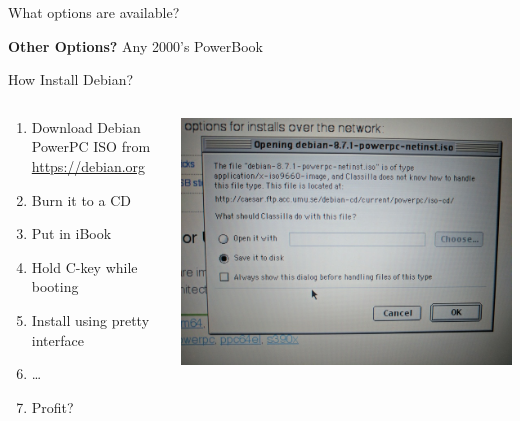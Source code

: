 \documentclass{lug}
\begin{document}
\begin{frame}{What options are available?}
    \pause

    \begin{center}
        \small
        \textbf{Other Options?} Any 2000's PowerBook
    \end{center}

\end{frame}

\begin{frame}{How Install Debian?}
    \begin{columns}
        \begin{column}{0.7\textwidth}
            \begin{enumerate}
                \setlength\itemsep{1em}
                \item Download Debian PowerPC ISO from \url{https://debian.org}
                \item Burn it to a CD
                \item Put in iBook
                \item Hold C-key while booting
                \item Install using pretty interface
                \item \dots
                \item Profit?
            \end{enumerate}
        \end{column}
        \begin{column}{0.3\textwidth}
            \includegraphics[width=\textwidth]{graphics/download}\par

\end{column}
\end{columns}
\end{frame}
\end{document}
